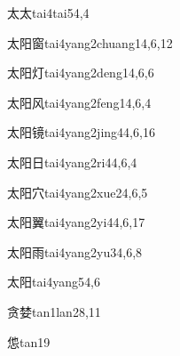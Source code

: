 \begin{entry}{太太}{tai4tai5}{4,4}
\end{entry}

\begin{entry}{太阳窗}{tai4yang2chuang1}{4,6,12}
\end{entry}

\begin{entry}{太阳灯}{tai4yang2deng1}{4,6,6}
\end{entry}

\begin{entry}{太阳风}{tai4yang2feng1}{4,6,4}
\end{entry}

\begin{entry}{太阳镜}{tai4yang2jing4}{4,6,16}
\end{entry}

\begin{entry}{太阳日}{tai4yang2ri4}{4,6,4}
\end{entry}

\begin{entry}{太阳穴}{tai4yang2xue2}{4,6,5}
\end{entry}

\begin{entry}{太阳翼}{tai4yang2yi4}{4,6,17}
\end{entry}

\begin{entry}{太阳雨}{tai4yang2yu3}{4,6,8}
\end{entry}

\begin{entry}{太阳}{tai4yang5}{4,6}
\end{entry}

\begin{entry}{贪婪}{tan1lan2}{8,11}
\end{entry}

\begin{entry}{怹}{tan1}{9}
\end{entry}

